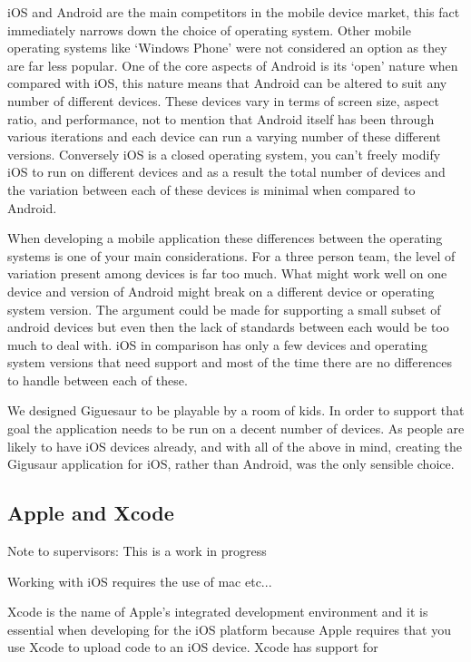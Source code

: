 \documentclass{article}
\begin{document}
iOS and Android are the main competitors in the mobile device market, this fact immediately narrows down the choice of operating system. Other mobile operating systems like `Windows Phone' were not considered an option as they are far less popular. One of the core aspects of Android is its `open' nature when compared with iOS, this nature means that Android can be altered to suit any number of different devices. These devices vary in terms of screen size, aspect ratio, and performance, not to mention that Android itself has been through various iterations and each device can run a varying number of these different versions. Conversely iOS is a closed operating system, you can't freely modify iOS to run on different devices and as a result the total number of devices and the variation between each of these devices is minimal when compared to Android. 

When developing a mobile application these differences between the operating systems is one of your main considerations. For a three person team, the level of variation present among devices is far too much. What might work well on one device and version of Android might break on a different device or operating system version. The argument could be made for supporting a small subset of android devices but even then the lack of standards between each would be too much to deal with. iOS in comparison has only a few devices and operating system versions that need support and most of the time there are no differences to handle between each of these. 

We designed Giguesaur to be playable by a room of kids. In order to support that goal the application needs to be run on a decent number of devices. As people are likely to have iOS devices already, and with all of the above in mind, creating the Gigusaur application for iOS, rather than Android, was the only sensible choice. 

\subsection{Apple and Xcode}

Note to supervisors: This is a work in progress

Working with iOS requires the use of mac etc...

Xcode is the name of Apple's integrated development environment and it is essential when developing for the iOS platform because Apple requires that you use Xcode to upload code to an iOS device. Xcode has support for 
\end{document}
